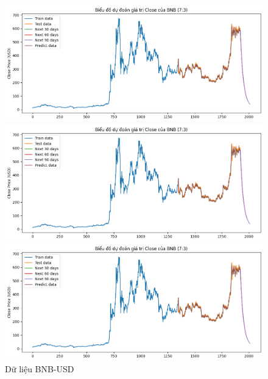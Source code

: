 \documentclass[conference]{IEEEtran}
\begin{document}
\begin{figure}[H]
    \centering
    \begin{minipage}{0.15\textwidth}
    \centering
    \includegraphics[width=1\textwidth]{Figure/BNB_73.png}
    \end{minipage}
    \hfill
    \begin{minipage}{0.15\textwidth}
    \centering
    \includegraphics[width=1\textwidth]{Figure/BNB_73.png}
    \end{minipage}
    \hfill
    \begin{minipage}{0.15\textwidth}
    \centering
    \includegraphics[width=1\textwidth]{Figure/BNB_73.png}
    \end{minipage}
    \caption{Dữ liệu BNB-USD}
    \label{fig:1}
\end{figure}
\end{document}
